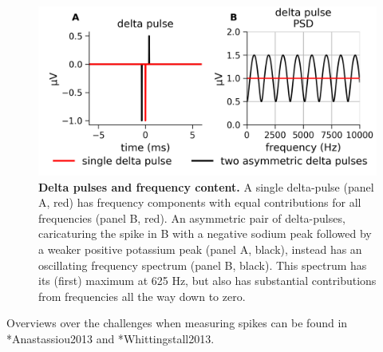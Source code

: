\begin{figure}[!ht]
\begin{center}
\includegraphics[width=1.0\textwidth]{Figures/Spikes/Spikes-fig_delta_pulse_freq_content.png}
\end{center}
\caption{\textbf{Delta pulses and frequency content.}
A single delta-pulse (panel A, red) has frequency components with equal contributions for all frequencies (panel B, red).
An asymmetric pair of delta-pulses, caricaturing the spike in B with a negative sodium peak followed by a weaker positive potassium peak (panel A, black), instead has an oscillating frequency spectrum (panel B, black). This spectrum has its (first) maximum at 625 Hz, but also has substantial contributions from frequencies all the way down to zero.
}
\label{fig:Spikes:freq_dep_delta}
\end{figure}


Overviews over the challenges when measuring spikes can be found in  \citeasnoun**{Anastassiou2013} and \citeasnoun**{Whittingstall2013}.

